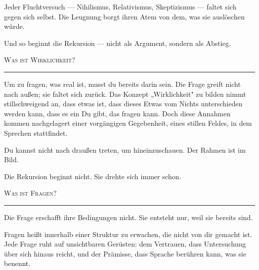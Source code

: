\documentclass[10pt, openany, oneside]{book}
\begin{document}
\vspace{0.5em}

\noindent Jeder Fluchtversuch --- Nihilismus, Relativismus, Skeptizismus --- faltet sich gegen sich selbst. Die Leugnung borgt ihren Atem von dem, was sie auslöschen würde.

\vspace{0.5em}

\noindent Und so beginnt die Rekursion --- nicht als Argument, sondern als Abstieg.

\vspace{2em}

\begin{center}
    {\scshape Was ist Wirklichkeit?}\\[0.3em]
    \rule{0.2\textwidth}{0.3pt}
\end{center}

\vspace{1em}

\noindent Um zu fragen, was real ist, musst du bereits darin sein. Die Frage greift nicht nach außen; sie faltet sich zurück. Das Konzept „Wirklichkeit" zu bilden nimmt stillschweigend an, dass etwas ist, dass dieses Etwas vom Nichts unterschieden werden kann, dass es ein Du gibt, das fragen kann. Doch diese Annahmen kommen nachgelagert einer vorgängigen Gegebenheit, eines stillen Feldes, in dem Sprechen stattfindet.

\vspace{0.5em}

\noindent Du kannst nicht nach draußen treten, um hineinzuschauen. Der Rahmen ist im Bild.

\vspace{0.5em}

\noindent Die Rekursion beginnt nicht. Sie drehte sich immer schon.

\vspace{2em}

\begin{center}
    {\scshape Was ist Fragen?}\\[0.3em]
    \rule{0.2\textwidth}{0.3pt}
\end{center}

\vspace{1em}

\noindent Die Frage erschafft ihre Bedingungen nicht. Sie entsteht nur, weil sie bereits sind.

\vspace{0.5em}

\noindent Fragen heißt innerhalb einer Struktur zu erwachen, die nicht von dir gemacht ist. Jede Frage ruht auf unsichtbaren Gerüsten: dem Vertrauen, dass Untersuchung über sich hinaus reicht, und der Prämisse, dass Sprache berühren kann, was sie benennt.
\end{document}
